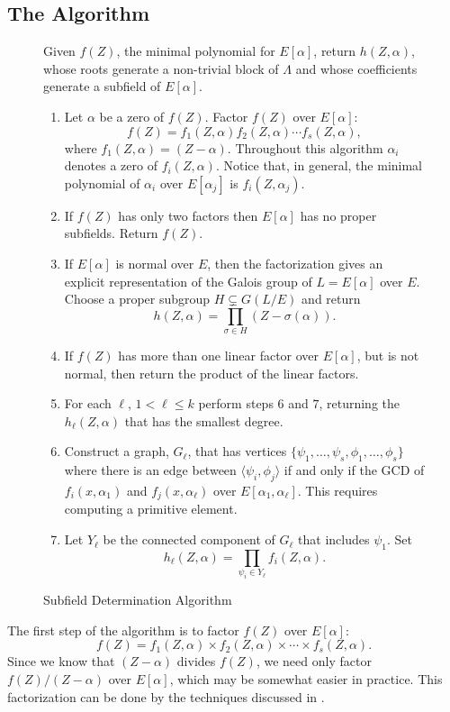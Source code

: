\subsection{The Algorithm}

\begin{figure}
\small
{} Given $f(Z)$, the minimal polynomial
for $E[\alpha]$, return $h(Z, \alpha)$, whose roots generate a
non-trivial block of $\Lambda$ and whose coefficients generate a
subfield of $E[\alpha]$.
\begin{enumerate}
\item Let $\alpha$ be a zero of $f(Z)$.  Factor $f(Z)$
over $E[\alpha]$: 
\[
f(Z) = f_1(Z, \alpha) f_2(Z, \alpha) \cdots f_s(Z, \alpha),
\]
where $f_1(Z, \alpha) = (Z - \alpha)$.
Throughout this algorithm $\alpha_i$ denotes a zero of $f_i(Z, \alpha)$.
Notice that, in general, the minimal polynomial of $\alpha_i$ over
$E[\alpha_j]$ is $f_i(Z, \alpha_j)$.
\item If $f(Z)$ has only two factors then $E[\alpha]$ has no proper
subfields.  Return $f(Z)$.
\item If $E[\alpha]$ is normal over $E$, then the factorization gives an
explicit representation of the Galois group of $L = E[\alpha]$ over $E$.
Choose a proper subgroup $H \varsubsetneq G(L/E)$ and return
\[
h(Z, \alpha) = \prod_{\sigma \in H} (Z - \sigma(\alpha)).
\]
\item If $f(Z)$ has more than one linear factor over
$E[\alpha]$, but is not normal, then return the product of the linear
factors.
\item For each $\ell$, $1 < \ell \le k$ perform steps $6$ and $7$,
returning the $h_{\ell}(Z, \alpha)$ that has the smallest degree.
\item Construct a graph, $G_{\ell}$,  that has vertices $\{\psi_1,
\ldots, \psi_s, \phi_1, \ldots, \phi_s\}$ where there is an edge between
$\langle \psi_i, \phi_j \rangle$ if and only if the GCD of $f_i(x,
\alpha_1)$ and $f_j(x, \alpha_{\ell})$ over 
$E[\alpha_1, \alpha_{\ell}]$.  This requires computing a primitive element.
\item Let $Y_{\ell}$ be the connected component of $G_{\ell}$ that
includes $\psi_1$. Set
\[
h_{\ell}(Z, \alpha) = \prod_{\psi_i \in Y_{\ell}} f_i(Z, \alpha).
\]
\end{enumerate}
\caption{Subfield Determination Algorithm \label{Alg:A:Fig}}
\end{figure}

The first step of the algorithm is to factor $f(Z)$ over
$E[\alpha]$:
\[
f(Z) = f_1(Z, \alpha)\times f_2(Z, \alpha)\times 
   \cdots \times f_s(Z, \alpha).
\]
Since we know that $(Z - \alpha)$ divides $f(Z)$, we need only factor
$f(Z)/(Z - \alpha)$ over $E[\alpha]$, which may be somewhat easier in
practice.  This factorization can be done by the techniques discussed
in . 

